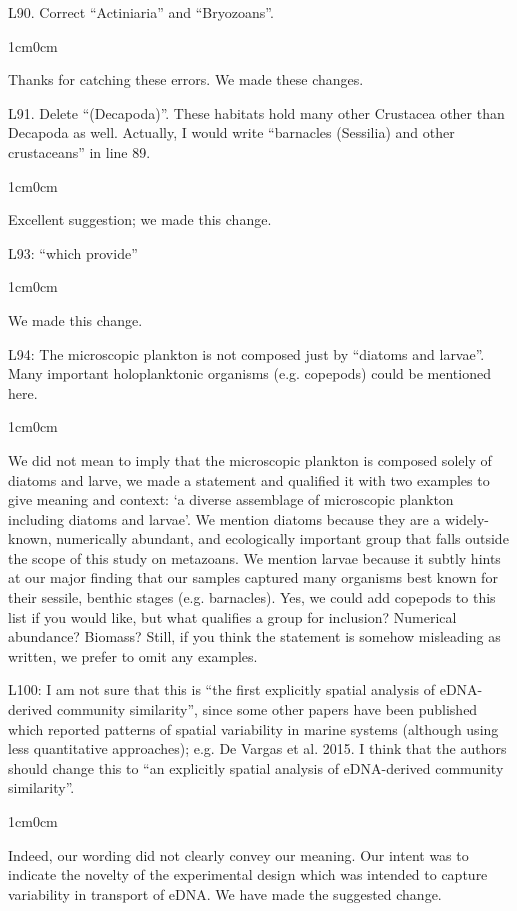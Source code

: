\documentclass{article}
\newenvironment{response}
	{
	\begin{adjustwidth}{1cm}{0cm}
	\color{peerjBlue}
	}
	{
	\end{adjustwidth}
	}
\begin{document}
L90. Correct ``Actiniaria'' and ``Bryozoans''.
\begin{response}
  Thanks for catching these errors. We made these changes.\\
\end{response}

L91. Delete ``(Decapoda)''. These habitats hold many other Crustacea other than Decapoda as well. Actually, I would write ``barnacles (Sessilia) and other crustaceans'' in line 89.
\begin{response}
  Excellent suggestion; we made this change.\\
\end{response}

L93: ``which provide''
\begin{response}
  We made this change.\\
\end{response}

L94: The microscopic plankton is not composed just by ``diatoms and larvae''. Many important holoplanktonic organisms (e.g. copepods) could be mentioned here.
\begin{response}
  We did not mean to imply that the microscopic plankton is composed solely of diatoms and larve, we made a  statement and qualified it with two examples to give meaning and context: `a diverse assemblage of microscopic plankton including diatoms and larvae'.
	We mention diatoms because they are a widely-known, numerically abundant, and ecologically important group that falls outside the scope of this study on metazoans.
	We mention larvae because it subtly hints at our major finding that our samples captured many organisms best known for their sessile, benthic stages (e.g. barnacles).
	Yes, we could add copepods to this list if you would like, but what qualifies a group for inclusion? Numerical abundance? Biomass?
	Still, if you think the statement is somehow misleading as written, we prefer to omit any examples.\\
\end{response}

L100: I am not sure that this is ``the first explicitly spatial analysis of eDNA-derived community similarity'', since some other papers have been published which reported patterns of spatial variability in marine systems (although using less quantitative approaches); e.g. De Vargas et al. 2015. I think that the authors should change this to ``an explicitly spatial analysis of eDNA-derived community similarity''.
\begin{response}
  Indeed, our wording did not clearly convey our meaning. Our intent was to indicate the novelty of the experimental design which was intended to capture variability in transport of eDNA. We have made the suggested change.\\
\end{response}
\end{document}
